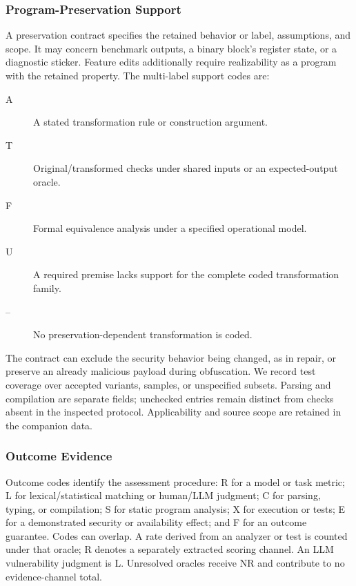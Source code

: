 \documentclass[acmsmall,screen,review,nonacm]{acmart}
\begin{document}
\subsubsection{Program-Preservation Support}
\label{sec:threat:semantics}
A preservation contract specifies the retained behavior or label, assumptions, and scope. It may concern benchmark outputs, a binary block's register state, or a diagnostic sticker. Feature edits additionally require realizability as a program with the retained property. The multi-label support codes are:
\begin{description}
\item[\textsf{A}] A stated transformation rule or construction argument.
\item[\textsf{T}] Original/transformed checks under shared inputs or an expected-output oracle.
\item[\textsf{F}] Formal equivalence analysis under a specified operational model.
\item[\textsf{U}] A required premise lacks support for the complete coded transformation family.
\item[\textsf{--}] No preservation-dependent transformation is coded.
\end{description}
The contract can exclude the security behavior being changed, as in repair, or preserve an already malicious payload during obfuscation. We record test coverage over accepted variants, samples, or unspecified subsets. Parsing and compilation are separate fields; unchecked entries remain distinct from checks absent in the inspected protocol. Applicability and source scope are retained in the companion data.

\subsubsection{Outcome Evidence}
\label{sec:outcome-evidence}
Outcome codes identify the assessment procedure: \textsf{R} for a model or task metric; \textsf{L} for lexical/statistical matching or human/LLM judgment; \textsf{C} for parsing, typing, or compilation; \textsf{S} for static program analysis; \textsf{X} for execution or tests; \textsf{E} for a demonstrated security or availability effect; and \textsf{F} for an outcome guarantee. Codes can overlap. A rate derived from an analyzer or test is counted under that oracle; \textsf{R} denotes a separately extracted scoring channel. An LLM vulnerability judgment is \textsf{L}. Unresolved oracles receive \textsf{NR} and contribute to no evidence-channel total.
\end{document}
